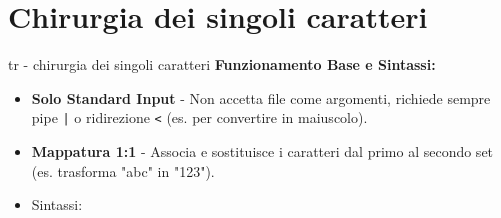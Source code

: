 \section{Chirurgia dei singoli caratteri}
\begin{frame}[fragile]{tr - chirurgia dei singoli caratteri}
	\textbf{Funzionamento Base e Sintassi:}
	\begin{itemize}
		\item \textbf{Solo Standard Input} - Non accetta file come argomenti, richiede sempre pipe \verb+|+ o ridirezione \verb+<+
		 (es.  per convertire in maiuscolo).
		\item \textbf{Mappatura 1:1} - Associa e sostituisce i caratteri dal primo al secondo set (es.  trasforma "abc" in "123").
		\item Sintassi: 
	\end{itemize}
\end{frame}

